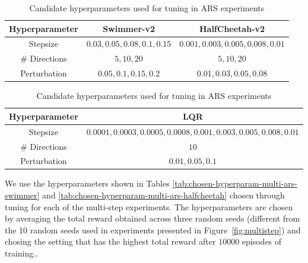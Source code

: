 \begin{table}[ht]
    \centering
    \begin{tabular}{|c|c|c|}
    \hline
    \textbf{Hyperparameter} & \textbf{Swimmer-v2} &
                                                    \textbf{HalfCheetah-v2}\\
    \hline
    Stepsize &  $0.03, 0.05, 0.08, 0.1, 0.15$ & $0.001, 0.003,
                                                0.005,0.008, 0.01$ \\
    \hline
    \# Directions &  $5, 10, 20$ & $5, 10, 20$\\
    \hline
    Perturbation & $0.05, 0.1, 0.15, 0.2$ & $0.01, 0.03, 0.05, 0.08$\\
    \hline
    \end{tabular}
    \caption{Candidate hyperparameters used for tuning in ARS experiments}
    \label{tab:hyperparam-multi-ars-mujoco}
\end{table}

\begin{table}[ht]
    \centering
    \begin{tabular}{|c|c|}
    \hline
    \textbf{Hyperparameter} & \textbf{LQR}\\
    \hline
    Stepsize &  $0.0001, 0.0003, 0.0005, 0.0008, 0.001, 0.003, 0.005,
               0.008, 0.01$ \\
    \hline
    \# Directions &  $10$ \\
    \hline
    Perturbation & $0.01, 0.05, 0.1$ \\
    \hline
    \end{tabular}
    \caption{Candidate hyperparameters used for tuning in ARS experiments}
    \label{tab:hyperparam-multi-ars-lqr}
  \end{table}

We use the hyperparameters shown in Tables
\ref{tab:chosen-hyperparam-multi-ars-swimmer} and \ref{tab:chosen-hyperparam-multi-ars-halfcheetah} chosen through tuning for each
of the multi-step experiments. The hyperparameters are chosen by
averaging the total reward obtained across three random seeds
(different from the 10 random seeds used in experiments presented in
Figure~\ref{fig:multistep}) and
chosing the setting that has the highest total reward after $10000$
episodes of training..

